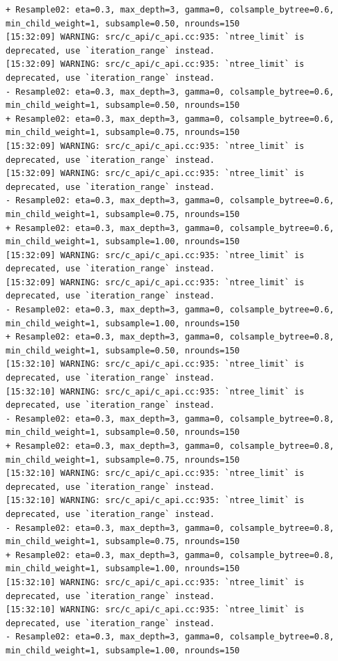 \documentclass[
  letterpaper,
  DIV=11,
  numbers=noendperiod]{scrartcl}
\begin{document}
\begin{verbatim}
+ Resample02: eta=0.3, max_depth=3, gamma=0, colsample_bytree=0.6, min_child_weight=1, subsample=0.50, nrounds=150 
[15:32:09] WARNING: src/c_api/c_api.cc:935: `ntree_limit` is deprecated, use `iteration_range` instead.
[15:32:09] WARNING: src/c_api/c_api.cc:935: `ntree_limit` is deprecated, use `iteration_range` instead.
- Resample02: eta=0.3, max_depth=3, gamma=0, colsample_bytree=0.6, min_child_weight=1, subsample=0.50, nrounds=150 
+ Resample02: eta=0.3, max_depth=3, gamma=0, colsample_bytree=0.6, min_child_weight=1, subsample=0.75, nrounds=150 
[15:32:09] WARNING: src/c_api/c_api.cc:935: `ntree_limit` is deprecated, use `iteration_range` instead.
[15:32:09] WARNING: src/c_api/c_api.cc:935: `ntree_limit` is deprecated, use `iteration_range` instead.
- Resample02: eta=0.3, max_depth=3, gamma=0, colsample_bytree=0.6, min_child_weight=1, subsample=0.75, nrounds=150 
+ Resample02: eta=0.3, max_depth=3, gamma=0, colsample_bytree=0.6, min_child_weight=1, subsample=1.00, nrounds=150 
[15:32:09] WARNING: src/c_api/c_api.cc:935: `ntree_limit` is deprecated, use `iteration_range` instead.
[15:32:09] WARNING: src/c_api/c_api.cc:935: `ntree_limit` is deprecated, use `iteration_range` instead.
- Resample02: eta=0.3, max_depth=3, gamma=0, colsample_bytree=0.6, min_child_weight=1, subsample=1.00, nrounds=150 
+ Resample02: eta=0.3, max_depth=3, gamma=0, colsample_bytree=0.8, min_child_weight=1, subsample=0.50, nrounds=150 
[15:32:10] WARNING: src/c_api/c_api.cc:935: `ntree_limit` is deprecated, use `iteration_range` instead.
[15:32:10] WARNING: src/c_api/c_api.cc:935: `ntree_limit` is deprecated, use `iteration_range` instead.
- Resample02: eta=0.3, max_depth=3, gamma=0, colsample_bytree=0.8, min_child_weight=1, subsample=0.50, nrounds=150 
+ Resample02: eta=0.3, max_depth=3, gamma=0, colsample_bytree=0.8, min_child_weight=1, subsample=0.75, nrounds=150 
[15:32:10] WARNING: src/c_api/c_api.cc:935: `ntree_limit` is deprecated, use `iteration_range` instead.
[15:32:10] WARNING: src/c_api/c_api.cc:935: `ntree_limit` is deprecated, use `iteration_range` instead.
- Resample02: eta=0.3, max_depth=3, gamma=0, colsample_bytree=0.8, min_child_weight=1, subsample=0.75, nrounds=150 
+ Resample02: eta=0.3, max_depth=3, gamma=0, colsample_bytree=0.8, min_child_weight=1, subsample=1.00, nrounds=150 
[15:32:10] WARNING: src/c_api/c_api.cc:935: `ntree_limit` is deprecated, use `iteration_range` instead.
[15:32:10] WARNING: src/c_api/c_api.cc:935: `ntree_limit` is deprecated, use `iteration_range` instead.
- Resample02: eta=0.3, max_depth=3, gamma=0, colsample_bytree=0.8, min_child_weight=1, subsample=1.00, nrounds=150 

\end{verbatim}
\end{document}
